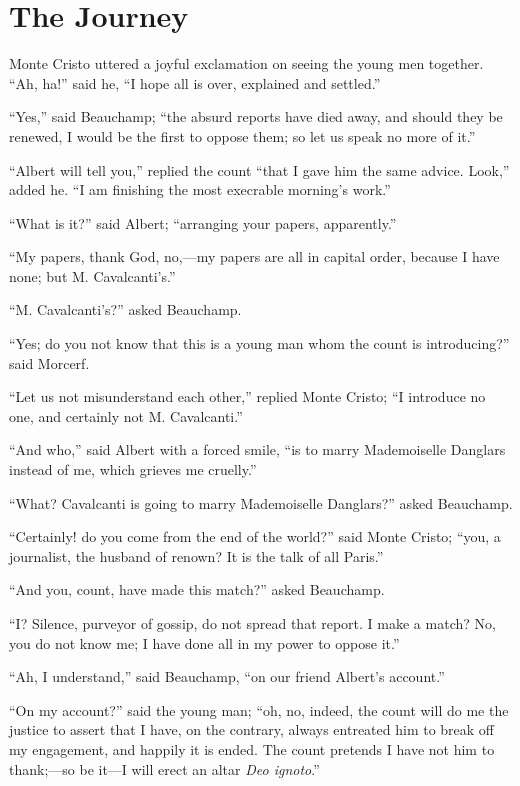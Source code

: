 \chapter{The Journey}

Monte Cristo uttered a joyful exclamation on seeing the young men
together. “Ah, ha!” said he, “I hope all is over, explained and
settled.”

“Yes,” said Beauchamp; “the absurd reports have died away, and should
they be renewed, I would be the first to oppose them; so let us speak
no more of it.”

“Albert will tell you,” replied the count “that I gave him the same
advice. Look,” added he. “I am finishing the most execrable morning’s
work.”

“What is it?” said Albert; “arranging your papers, apparently.”

“My papers, thank God, no,—my papers are all in capital order, because
I have none; but M. Cavalcanti’s.”

“M. Cavalcanti’s?” asked Beauchamp.

“Yes; do you not know that this is a young man whom the count is
introducing?” said Morcerf.

“Let us not misunderstand each other,” replied Monte Cristo; “I
introduce no one, and certainly not M. Cavalcanti.”

“And who,” said Albert with a forced smile, “is to marry Mademoiselle
Danglars instead of me, which grieves me cruelly.”

“What? Cavalcanti is going to marry Mademoiselle Danglars?” asked
Beauchamp.

“Certainly! do you come from the end of the world?” said Monte Cristo;
“you, a journalist, the husband of renown? It is the talk of all
Paris.”

“And you, count, have made this match?” asked Beauchamp.

“I? Silence, purveyor of gossip, do not spread that report. I make a
match? No, you do not know me; I have done all in my power to oppose
it.”

“Ah, I understand,” said Beauchamp, “on our friend Albert’s account.”

“On my account?” said the young man; “oh, no, indeed, the count will do
me the justice to assert that I have, on the contrary, always entreated
him to break off my engagement, and happily it is ended. The count
pretends I have not him to thank;—so be it—I will erect an altar \textit{Deo
ignoto}.”


